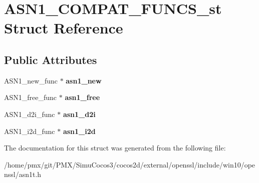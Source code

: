 \hypertarget{structASN1__COMPAT__FUNCS__st}{}\section{A\+S\+N1\+\_\+\+C\+O\+M\+P\+A\+T\+\_\+\+F\+U\+N\+C\+S\+\_\+st Struct Reference}
\label{structASN1__COMPAT__FUNCS__st}
\subsection*{Public Attributes}
\begin{DoxyCompactItemize}
\item 
\mbox{\label{structASN1__COMPAT__FUNCS__st_a94f635811e78f33d0fe04c596dbfc11e}} 
A\+S\+N1\+\_\+new\+\_\+func $\ast$ {\bfseries asn1\+\_\+new}
\item 
\mbox{\label{structASN1__COMPAT__FUNCS__st_adc6f726c319ead22c5b6c3aee130b8df}} 
A\+S\+N1\+\_\+free\+\_\+func $\ast$ {\bfseries asn1\+\_\+free}
\item 
\mbox{\label{structASN1__COMPAT__FUNCS__st_aeddb5865fc5b6642fc062d737a032b2b}} 
A\+S\+N1\+\_\+d2i\+\_\+func $\ast$ {\bfseries asn1\+\_\+d2i}
\item 
\mbox{\label{structASN1__COMPAT__FUNCS__st_a0cc66997a2839cd692302f0cc1ffbb56}} 
A\+S\+N1\+\_\+i2d\+\_\+func $\ast$ {\bfseries asn1\+\_\+i2d}
\end{DoxyCompactItemize}


The documentation for this struct was generated from the following file\+:\begin{DoxyCompactItemize}
\item 
/home/pmx/git/\+P\+M\+X/\+Simu\+Cocos3/cocos2d/external/openssl/include/win10/openssl/asn1t.\+h\end{DoxyCompactItemize}
